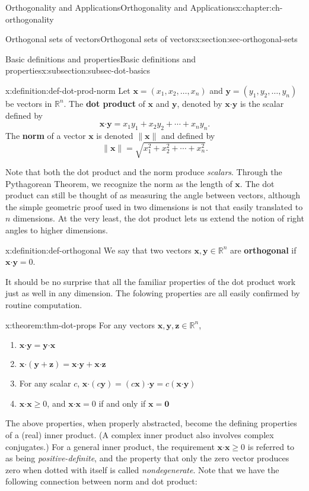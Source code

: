 \documentclass[oneside,10pt,]{book}
\newcommand{\terminology}[1]{\textbf{#1}}
\numberwithin{equation}{section}
\newcommand{\R}{\mathbb{R}}
\newcommand{\dotp}{\!\boldsymbol{\cdot}\!}
\newcommand{\len}[1]{\lVert #1\rVert}
\newcommand{\zz}{\mathbf{z}}
\newcommand{\xx}{\mathbf{x}}
\newcommand{\yy}{\mathbf{y}}
\begin{document}
\begin{chapterptx}{Orthogonality and Applications}{}{Orthogonality and Applications}{}{}{x:chapter:ch-orthogonality}
\begin{sectionptx}{Orthogonal sets of vectors}{}{Orthogonal sets of vectors}{}{}{x:section:sec-orthogonal-sets}
\begin{subsectionptx}{Basic definitions and properties}{}{Basic definitions and properties}{}{}{x:subsection:subsec-dot-basics}
\begin{definition}{}{x:definition:def-dot-prod-norm}%
Let \(\xx=(x_1,x_2,\ldots, x_n)\) and \(\yy=(y_1,y_2,\ldots, y_n)\) be vectors in \(\R^n\). The \terminology{dot product} of \(\xx\) and \(\yy\), denoted by \(\xx\dotp\yy\) is the scalar defined by%
\begin{equation*}
\xx\dotp \yy = x_1y_1+x_2y_2+\cdots + x_ny_n\text{.}
\end{equation*}
The \terminology{norm} of a vector \(\xx\) is denoted \(\len{\xx}\) and defined by%
\begin{equation*}
\len{\xx} = \sqrt{x_1^2+x_2^2+\cdots + x_n^2}\text{.}
\end{equation*}
%
\end{definition}
Note that both the dot product and the norm produce \emph{scalars}. Through the Pythagorean Theorem, we recognize the norm as the length of \(\xx\). The dot product can still be thought of as measuring the angle between vectors, although the simple geometric proof used in two dimensions is not that easily translated to \(n\) dimensions. At the very least, the dot product lets us extend the notion of right angles to higher dimensions.%
\begin{definition}{}{x:definition:def-orthogonal}%
We say that two vectors \(\xx,\yy\in\R^n\) are \terminology{orthogonal} if \(\xx\dotp\yy = 0\).%
\end{definition}
It should be no surprise that all the familiar properties of the dot product work just as well in any dimension. The folowing properties are all easily confirmed by routine computation.%
\begin{theorem}{}{}{x:theorem:thm-dot-props}%
For any vectors \(\xx,\yy,\zz\in\R^n\),%
\begin{enumerate}
\item{}\(\displaystyle \xx\dotp\yy = \yy\dotp\xx\)%
\item{}\(\displaystyle \xx\dotp(\yy+\zz)=\xx\dotp\yy+\xx\dotp\zz\)%
\item{}For any scalar \(c\), \(\xx\dotp(c\yy) = (c\xx)\dotp\yy=c(\xx\dotp\yy)\)%
\item{}\(\xx\dotp\xx\geq 0\), and \(\xx\dotp\xx=0\) if and only if \(\xx=\mathbf{0}\)%
\end{enumerate}
%
\end{theorem}
The above properties, when properly abstracted, become the defining properties of a (real) inner product. (A complex inner product also involves complex conjugates.) For a general inner product, the requirement \(\xx\dotp\xx\geq 0\) is referred to as being \emph{positive-definite}, and the property that only the zero vector produces zero when dotted with itself is called \emph{nondegenerate}. Note that we have the following connection between norm and dot product:%

\end{subsectionptx}
\end{sectionptx}
\end{chapterptx}
\end{document}
